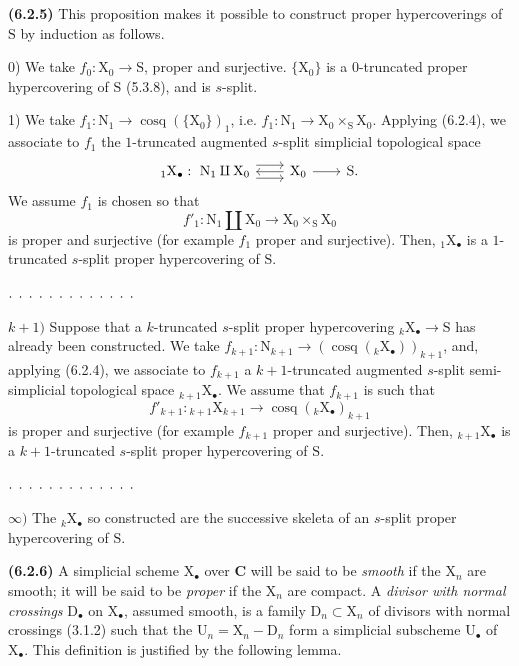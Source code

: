 \documentclass[11pt,leqno]{article}
\begin{document}
\textbf{(6.2.5)} This proposition makes it possible to construct proper hypercoverings of \(\mathrm{S}\) by induction as follows.

0) We take \(f_0:\mathrm{X}_0\to\mathrm{S}\), proper and surjective. \(\{\mathrm{X}_0\}\) is a \(0\)-truncated proper hypercovering of \(\mathrm{S}\) (5.3.8), and is \(s\)-split.

1) We take \(f_1:\mathrm{N}_1\to\operatorname{cosq}(\{\mathrm{X}_0\})_1\), i.e. \(f_1:\mathrm{N}_1\to\mathrm{X}_0\times_{\mathrm{S}}\mathrm{X}_0\). Applying (6.2.4), we associate to \(f_1\) the \(1\)-truncated augmented \(s\)-split simplicial topological space
\[
\begin{tikzcd}[column sep=2em]
{}_{1}\mathrm{X}_{\bullet}:\ \mathrm{N}_1\amalg\mathrm{X}_0
  \arrow[r,shift left=1.1ex]\arrow[r,shift right=1.1ex]
  & \mathrm{X}_0\arrow[l]\arrow[r] & \mathrm{S}.
\end{tikzcd}
\]
We assume \(f_1\) is chosen so that
\[
f'_1:\mathrm{N}_1\amalg\mathrm{X}_0
\to\mathrm{X}_0\times_{\mathrm{S}}\mathrm{X}_0
\]
is proper and surjective (for example \(f_1\) proper and surjective). Then, \({}_{1}\mathrm{X}_{\bullet}\) is a \(1\)-truncated \(s\)-split proper hypercovering of \(\mathrm{S}\).

\noindent\(\ldotp\;\ldotp\;\ldotp\;\ldotp\;\ldotp\;\ldotp\;\ldotp\;\ldotp\;\ldotp\;\ldotp\;\ldotp\;\ldotp\;\ldotp\)

\(k+1)\) Suppose that a \(k\)-truncated \(s\)-split proper hypercovering \({}_{k}\mathrm{X}_{\bullet}\to\mathrm{S}\) has already been constructed. We take \(f_{k+1}:\mathrm{N}_{k+1}\to(\operatorname{cosq}({}_{k}\mathrm{X}_{\bullet}))_{k+1}\), and, applying (6.2.4), we associate to \(f_{k+1}\) a \(k+1\)-truncated augmented \(s\)-split semi-simplicial topological space \({}_{k+1}\mathrm{X}_{\bullet}\). We assume that \(f_{k+1}\) is such that
\[
f'_{k+1}:{}_{k+1}\mathrm{X}_{k+1}
\to\operatorname{cosq}({}_{k}\mathrm{X}_{\bullet})_{k+1}
\]
is proper and surjective (for example \(f_{k+1}\) proper and surjective). Then, \({}_{k+1}\mathrm{X}_{\bullet}\) is a \(k+1\)-truncated \(s\)-split proper hypercovering of \(\mathrm{S}\).

\noindent\(\ldotp\;\ldotp\;\ldotp\;\ldotp\;\ldotp\;\ldotp\;\ldotp\;\ldotp\;\ldotp\;\ldotp\;\ldotp\;\ldotp\;\ldotp\)

\(\infty)\) The \({}_{k}\mathrm{X}_{\bullet}\) so constructed are the successive skeleta of an \(s\)-split proper hypercovering of \(\mathrm{S}\).

\textbf{(6.2.6)} A simplicial scheme \(\mathrm{X}_{\bullet}\) over \(\mathbf{C}\) will be said to be \textit{smooth} if the \(\mathrm{X}_n\) are smooth; it will be said to be \textit{proper} if the \(\mathrm{X}_n\) are compact. A \textit{divisor with normal crossings} \(\mathrm{D}_{\bullet}\) on \(\mathrm{X}_{\bullet}\), assumed smooth, is a family \(\mathrm{D}_n\subset\mathrm{X}_n\) of divisors with normal crossings (3.1.2) such that the \(\mathrm{U}_n=\mathrm{X}_n-\mathrm{D}_n\) form a simplicial subscheme \(\mathrm{U}_{\bullet}\) of \(\mathrm{X}_{\bullet}\). This definition is justified by the following lemma.
\end{document}
